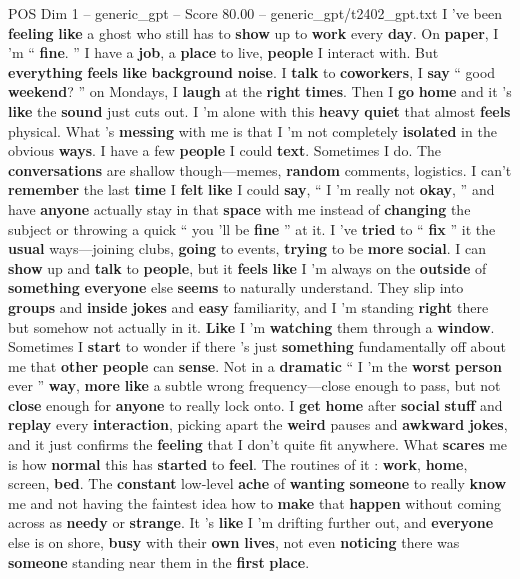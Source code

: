 \begin{textsample}{POS Dim 1 – generic\_gpt – Score 80.00 – generic\_gpt/t2402\_gpt.txt}  \label{ex:f1_pos_012}
I ’ve been \textbf{feeling} \textbf{like} a ghost who still has to \textbf{show} up to \textbf{work} every \textbf{day}.
On \textbf{paper}, I ’m “ \textbf{fine}. ” I have a \textbf{job}, a \textbf{place} to live, \textbf{people} I interact with.
But \textbf{everything} \textbf{feels} \textbf{like} \textbf{background} \textbf{noise}.
I \textbf{talk} to \textbf{coworkers}, I \textbf{say} “ good \textbf{weekend}? ” on Mondays, I \textbf{laugh} at the \textbf{right} \textbf{times}.
Then I \textbf{go} \textbf{home} and it ’s \textbf{like} the \textbf{sound} just cuts out.
I ’m alone with this \textbf{heavy} \textbf{quiet} that almost \textbf{feels} physical.
What ’s \textbf{messing} with me is that I ’m not completely \textbf{isolated} in the obvious \textbf{ways}.
I have a few \textbf{people} I could \textbf{text}.
Sometimes I do.
The \textbf{conversations} are shallow though—memes, \textbf{random} comments, logistics.
I can't \textbf{remember} the last \textbf{time} I \textbf{felt} \textbf{like} I could \textbf{say}, “ I ’m really not \textbf{okay}, ” and have \textbf{anyone} actually stay in that \textbf{space} with me instead of \textbf{changing} the subject or throwing a quick “ you ’ll be \textbf{fine} ” at it.
I ’ve \textbf{tried} to “ \textbf{fix} ” it the \textbf{usual} ways—joining clubs, \textbf{going} to events, \textbf{trying} to be \textbf{more} \textbf{social}.
I can \textbf{show} up and \textbf{talk} to \textbf{people}, but it \textbf{feels} \textbf{like} I ’m always on the \textbf{outside} of \textbf{something} \textbf{everyone} else \textbf{seems} to naturally understand.
They slip into \textbf{groups} and \textbf{inside} \textbf{jokes} and \textbf{easy} familiarity, and I ’m standing \textbf{right} there but somehow not actually in it. \textbf{Like} I ’m \textbf{watching} them through a \textbf{window}.
Sometimes I \textbf{start} to wonder if there ’s just \textbf{something} fundamentally off about me that \textbf{other} \textbf{people} can \textbf{sense}.
Not in a \textbf{dramatic} “ I ’m the \textbf{worst} \textbf{person} ever ” \textbf{way}, \textbf{more} \textbf{like} a subtle wrong frequency—close enough to pass, but not \textbf{close} enough for \textbf{anyone} to really lock onto.
I \textbf{get} \textbf{home} after \textbf{social} \textbf{stuff} and \textbf{replay} every \textbf{interaction}, picking apart the \textbf{weird} pauses and \textbf{awkward} \textbf{jokes}, and it just confirms the \textbf{feeling} that I don't quite fit anywhere.
What \textbf{scares} me is how \textbf{normal} this has \textbf{started} to \textbf{feel}.
The routines of it : \textbf{work}, \textbf{home}, screen, \textbf{bed}.
The \textbf{constant} low-level \textbf{ache} of \textbf{wanting} \textbf{someone} to really \textbf{know} me and not having the faintest idea how to \textbf{make} that \textbf{happen} without coming across as \textbf{needy} or \textbf{strange}.
It ’s \textbf{like} I ’m drifting further out, and \textbf{everyone} else is on shore, \textbf{busy} with their \textbf{own} \textbf{lives}, not even \textbf{noticing} there was \textbf{someone} standing near them in the \textbf{first} \textbf{place}.


\end{textsample}
